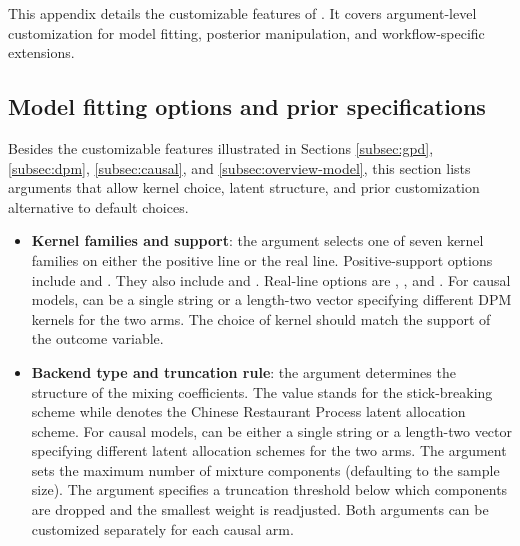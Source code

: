 \documentclass[article]{jss}\usepackage[]{graphicx}\usepackage[]{xcolor}
\begin{document}
This appendix details the customizable features of . It covers argument-level customization for model fitting, posterior manipulation, and workflow-specific extensions.

\subsection{Model fitting options and prior specifications}
\label{subsec:app-modeling}

Besides the customizable features illustrated in Sections \ref{subsec:gpd}, \ref{subsec:dpm}, \ref{subsec:causal}, and \ref{subsec:overview-model}, this section lists arguments that allow kernel choice, latent structure, and prior customization alternative to default choices.

\begin{itemize}
\item \textbf{Kernel families and support}: the argument  selects one of seven kernel families on either the positive line or the real line. Positive-support options include  and . They also include  and . Real-line options are , , and . For causal models,  can be a single string or a length-two vector specifying different DPM kernels for the two arms. The choice of kernel should match the support of the outcome variable.

\item \textbf{Backend type and truncation rule}: the argument  determines the structure of the mixing coefficients. The value  stands for the stick-breaking scheme while  denotes the Chinese Restaurant Process latent allocation scheme. For causal models,  can be either a single string or a length-two vector specifying different latent allocation schemes for the two arms. The argument  sets the maximum number of mixture components (defaulting to the sample size). The argument  specifies a truncation threshold below which components are dropped and the smallest weight is readjusted. Both arguments can be customized separately for each causal arm.


\end{itemize}
\end{document}
